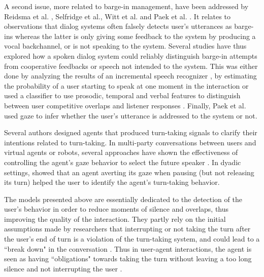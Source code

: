 A second issue, more related to barge-in management,
have been addressed by Reidsma et al. \citep{reidsma_continuous_2011}, Selfridge et al.\citep{selfridge_continuously_2013}, Witt et al.\citep{witt_modeling_2014} and Paek et al. \citep{paek_continuous_2000}. It relates to observations
that dialog systems often falsely detects user's utterances as barge-ins whereas
the latter is only giving some feedback to the system by
producing a vocal backchannel, or is not speaking to the
system. Several studies have thus explored how a spoken
dialog system could reliably distinguish barge-in
attempts from cooperative feedbacks or speech not intended
to the system. This was either done by analyzing the results of an incremental speech recognizer \citep{selfridge_continuously_2013}, by estimating the probability of a user starting to speak at one moment in the interaction \citep{witt_modeling_2014} or used a classifier to use prosodic, temporal and verbal features to distinguish between user competitive overlaps and listener responses \citep{reidsma_continuous_2011}. Finally, Paek et al. \citep{paek_continuous_2000} used gaze to infer whether the user's utterance is addressed to the system or not. 


Several authors designed agents that produced turn-taking signals to clarify their intentions related to turn-taking. In multi-party conversations between users and virtual agents or robots, several approaches have shown the effectiveness of controlling the agent's gaze behavior to select the future speaker \citep{mutlu_storytelling_2006,bohus_facilitating_2010,al_moubayed_regulating_2015}. In dyadic settings, \citep{skantze_turn-taking_2014} showed that an agent averting its gaze when pausing (but not releasing its turn) helped the user to identify the agent's turn-taking behavior.

The models presented above are essentially dedicated to the detection of the user's behavior in order to reduce moments of silence and overlaps, thus improving the quality of the interaction. 
They partly rely on the initial assumptions made by researchers 
that interrupting or not taking the turn after the user's end of turn 
is a violation of the turn-taking system, and could lead to a ``break
down" in the conversation \citep{cutler_analysis_1986}. 
Thus in user-agent interactions, 
the agent is seen as having ``obligations" towards
taking the turn without leaving a too long silence
and not interrupting the user \citep{de_kok_multimodal_2009}.

